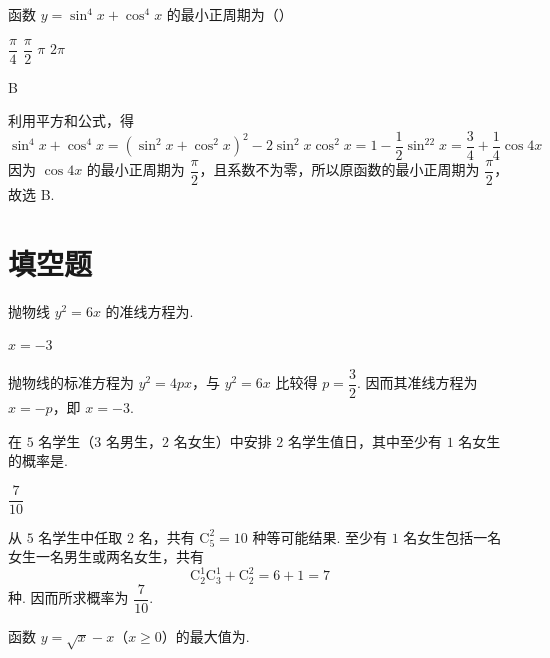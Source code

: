 \begin{problem}
函数 \(y=\sin^4x+\cos^4x\) 的最小正周期为（\quad）

\choices
    {\(\dfrac\pi4\)}
    {\(\dfrac\pi2\)}
    {\(\pi\)}
    {\(2\pi\)}
\end{problem}

\begin{answer}
B
\end{answer}

\begin{solution}
利用平方和公式，得
\[
\sin^4x+\cos^4x
=(\sin^2x+\cos^2x)^2-2\sin^2x\cos^2x
=1-\frac12\sin^22x
=\frac34+\frac14\cos4x
\]
因为 \(\cos4x\) 的最小正周期为 \(\dfrac\pi2\)，且系数不为零，所以原函数的最小正周期为 \(\dfrac\pi2\)，故选 B.
\end{solution}

\section{填空题}

\begin{problem}
抛物线 \(y^2=6x\) 的准线方程为\fillinblank{}.
\end{problem}

\begin{answer}
\(x=-3\)
\end{answer}

\begin{solution}
抛物线的标准方程为 \(y^2=4px\)，与 \(y^2=6x\) 比较得 \(p=\dfrac32\). 因而其准线方程为 \(x=-p\)，即 \(x=-3\).
\end{solution}

\begin{problem}
在 \(5\) 名学生（\(3\) 名男生，\(2\) 名女生）中安排 \(2\) 名学生值日，其中至少有 \(1\) 名女生的概率是\fillinblank{}.
\end{problem}

\begin{answer}
\(\dfrac7{10}\)
\end{answer}

\begin{solution}
从 \(5\) 名学生中任取 \(2\) 名，共有 \(\mathrm C_5^2=10\) 种等可能结果. 至少有 \(1\) 名女生包括一名女生一名男生或两名女生，共有
\[
\mathrm C_2^1\mathrm C_3^1+\mathrm C_2^2=6+1=7
\]
种. 因而所求概率为 \(\dfrac7{10}\).
\end{solution}

\begin{problem}
函数 \(y=\sqrt{x}-x\)（\(x\geqslant0\)）的最大值为\fillinblank{}.
\end{problem}

